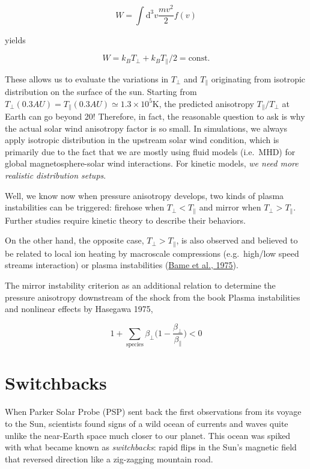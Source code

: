 \documentclass[
  notoc %
]{tufte-book}
\begin{document}
\[
W = \int \mathrm{d}^3v \frac{mv^2}{2}f(v)
\]

yields

\[
W = k_B T_\perp + k_B T_\parallel/2 = \text{const}.
\]

These allows us to evaluate the variations in \(T_\perp\) and
\(T_\parallel\) originating from isotropic distribution on the surface
of the sun. Starting from
\(T_\perp(0.3 AU) = T_\parallel(0.3 AU)\simeq 1.3\times 10^{5}\textrm{K}\),
the predicted anisotropy \(T_\parallel / T_\perp\) at Earth can go
beyond 20! Therefore, in fact, the reasonable question to ask is why the
actual solar wind anisotropy factor is so small. In simulations, we
always apply isotropic distribution in the upstream solar wind
condition, which is primarily due to the fact that we are mostly using
fluid models (i.e.~MHD) for global magnetosphere-solar wind
interactions. For kinetic models, \emph{we need more realistic
distribution setups}.

Well, we know now when pressure anisotropy develops, two kinds of plasma
instabilities can be triggered: firehose when \(T_\perp < T_\parallel\)
and mirror when \(T_\perp > T_\parallel\). Further studies require
kinetic theory to describe their behaviors.

On the other hand, the opposite case, \(T_\perp > T_\parallel\), is also
observed and believed to be related to local ion heating by macroscale
compressions (e.g.~high/low speed streams interaction) or plasma
instabilities (\protect\hyperlink{ref-bame1975evidence}{Bame et al.,
1975}).

The mirror instability criterion as an additional relation to determine
the pressure anisotropy downstream of the shock from the book Plasma
instabilities and nonlinear effects by Hasegawa 1975,

\[
1 + \sum_{\textrm{species}} \beta_\perp \big( 1 - \frac{\beta_\perp}{\beta_\parallel} \big) < 0
\]

\hypertarget{switchbacks}{%
\section{Switchbacks}\label{switchbacks}}

When Parker Solar Probe (PSP) sent back the first observations from its
voyage to the Sun, scientists found signs of a wild ocean of currents
and waves quite unlike the near-Earth space much closer to our planet.
This ocean was spiked with what became known as \emph{switchbacks}:
rapid flips in the Sun's magnetic field that reversed direction like a
zig-zagging mountain road.~
\end{document}
